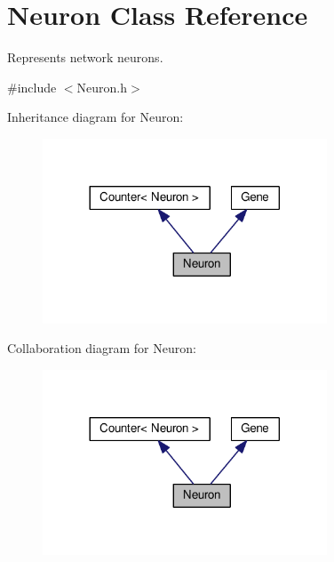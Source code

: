 \hypertarget{classNeuron}{}\section{Neuron Class Reference}
\label{classNeuron}


Represents network neurons.  




{\ttfamily \#include $<$Neuron.\+h$>$}



Inheritance diagram for Neuron\+:
\nopagebreak
\begin{figure}[H]
\begin{center}
\leavevmode
\includegraphics[width=240pt]{classNeuron__inherit__graph}
\end{center}
\end{figure}


Collaboration diagram for Neuron\+:
\nopagebreak
\begin{figure}[H]
\begin{center}
\leavevmode
\includegraphics[width=240pt]{classNeuron__coll__graph}
\end{center}
\end{figure}

